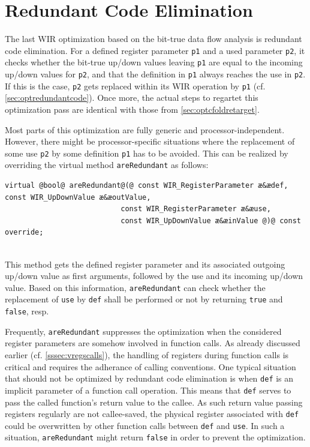 \section{Redundant Code Elimination}
\label{sec:optredundantcoderetarget}

The last \gls{WIR} optimization based on the bit-true data flow analysis is redundant code elimination.
For a defined register parameter \texttt{p1} and a used parameter \texttt{p2}, it checks whether the bit-true up/down values leaving \texttt{p1} are equal to the incoming up/down values for \texttt{p2}, and that the definition in \texttt{p1} always reaches the use in \texttt{p2}.
If this is the case, \texttt{p2} gets replaced within its \gls{WIR} operation by \texttt{p1} (cf. \cref{sec:optredundantcode}).
Once more, the actual steps to regartet this optimization pass are identical with those from \cref{sec:optcfoldretarget}.

Most parts of this optimization are fully generic and processor-independent.
However, there might be processor-specific situations where the replacement of some use \texttt{p2} by some definition \texttt{p1} has to be avoided.
This can be realized by overriding the virtual method \texttt{areRedundant} as follows: \\
\begin{lstlisting}[style=code,float=!ht,aboveskip=-0.8 \baselineskip,belowskip=-0.8 \baselineskip]
virtual @bool@ areRedundant@(@ const WIR_RegisterParameter æ&ædef, const WIR_UpDownValue æ&æoutValue,
                           const WIR_RegisterParameter æ&æuse,
                           const WIR_UpDownValue æ&æinValue @)@ const override;
\end{lstlisting}
\\
This method gets the defined register parameter and its associated outgoing up/down value as first arguments, followed by the use and its incoming up/down value.
Based on this information, \texttt{areRedundant} can check whether the replacement of \texttt{use} by \texttt{def} shall be performed or not by returning \texttt{true} and \texttt{false}, resp.

Frequently, \texttt{areRedundant} suppresses the optimization when the considered register parameters are somehow involved in function calls.
As already discussed earlier (cf. \cref{sssec:vregscalls}), the handling of registers during function calls is critical and requires the adherance of calling conventions.
One typical situation that should not be optimized by redundant code elimination is when \texttt{def} is an implicit parameter of a function call operation.
This means that \texttt{def} serves to pass the called function's return value to the callee.
As such return value passing registers regularly are not callee-saved, the physical register associated with \texttt{def} could be overwritten by other function calls between \texttt{def} and \texttt{use}.
In such a situation, \texttt{areRedundant} might return \texttt{false} in order to prevent the optimization.

